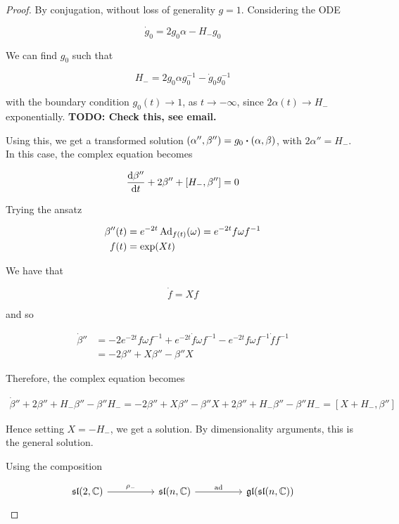 \documentclass{report}
\renewcommand{\sl}{\mathfrak{sl}}
\begin{document}
\begin{proof}
    By conjugation, without loss of generality \(g = 1\). Considering the ODE

    \begin{equation*}
            \dot g_0 = 2g_0\alpha - H_-g_0
    \end{equation*}

    We can find \(g_0\) such that

    \[H_- = 2g_0\alpha g_0^{-1} - \dot g_0 g_0^{-1}\]

    with the boundary condition \(g_0(t) \to 1\), as \(t \to -\infty\), since \(2\alpha(t) \to H_-\) exponentially. \textbf{TODO: Check this, see email.}

    Using this, we get a transformed solution \((\alpha'', \beta'') = g_0\vdot(\alpha,\beta)\), with \(2\alpha'' = H_-\). In this case, the complex equation becomes

    \[\dv{\beta''}{t} + 2\beta'' + [H_-, \beta''] = 0\]

    Trying the ansatz

    \begin{align*}
        \beta''(t) &= e^{-2t}\operatorname{Ad}_{f(t)}(\omega) = e^{-2t}f\omega f^{-1} \\
        f(t) &= \exp(Xt)
    \end{align*}

    We have that

    \[\dot f = Xf\]

    and so

    \begin{align*}
        \dot\beta'' &= -2e^{-2t}f\omega f^{-1} + e^{-2t}\dot f \omega f^{-1} - e^{-2t}f\omega f^{-1}\dot f f^{-1} \\
        &= -2\beta'' + X\beta'' - \beta'' X
    \end{align*}

    Therefore, the complex equation becomes

    \begin{align*}
        \dot\beta'' + 2\beta'' + H_-\beta'' - \beta''H_- = -2\beta'' + X\beta'' - \beta''X + 2\beta'' + H_-\beta'' - \beta''H_- = [X + H_-, \beta'']
    \end{align*}

    Hence setting \(X = -H_-\), we get a solution. By dimensionality arguments, this is the general solution.

    Using the composition

\[\begin{tikzcd}[ampersand replacement=\&]
	{\sl(2, \C)} \&\& {\sl(n, \C)} \&\& {\gl(\sl(n, \C))}
	\arrow["{\rho_-}", from=1-1, to=1-3]
	\arrow["\ad", from=1-3, to=1-5]
\end{tikzcd}\]


\end{proof}
\end{document}

